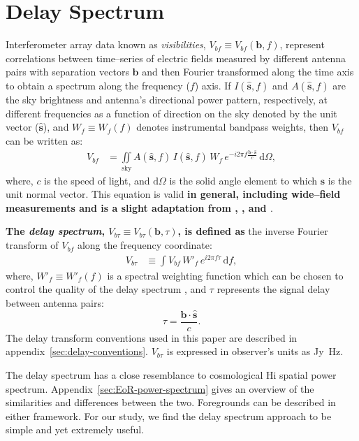 \documentclass[preprint2,iop,numberedappendix,twocolappendix,appendixfloats]{emulateapj}
\newcommand{\dif}{\mathrm{d}}
\begin{document}
\section{Delay Spectrum}\label{sec:delay-spectrum}

Interferometer array data known as {\it visibilities}, $V_{bf}\equiv V_{bf}(\boldsymbol{b},f)$, represent correlations between time--series of electric fields measured by different antenna pairs with separation vectors $\boldsymbol{b}$ and then Fourier transformed along the time axis to obtain a spectrum along the frequency ($f$) axis. If $I(\hat{\boldsymbol{s}},f)$ and $A(\hat{\boldsymbol{s}},f)$ are the sky brightness and antenna's directional power pattern, respectively, at different frequencies as a function of direction on the sky denoted by the unit vector ($\hat{\boldsymbol{s}}$), and $W_f\equiv W_f(f)$ denotes instrumental bandpass weights, then $V_{bf}$ can be written as:
\begin{align}\label{eqn:obsvis}
  V_{bf} &= \iint\limits_\textrm{sky} A(\hat{\boldsymbol{s}},f)\,I(\hat{\boldsymbol{s}},f)\,W_f\,e^{-i2\pi f\frac{\boldsymbol{b}\cdot\hat{\boldsymbol{s}}}{c}}\,\dif\Omega,
\end{align}
where, $c$ is the speed of light, and $\dif\Omega$ is the solid angle element to which $\hat{\boldsymbol{s}}$ is the unit normal vector. This equation is valid {\bf in general, including wide--field measurements and is a slight adaptation from \citet{van34}, \citet{zer38}, and \citet{tho01}}.

{\bf The {\it delay spectrum}, $V_{b\tau}\equiv V_{b\tau}(\boldsymbol{b},\tau)$, is defined as} the inverse Fourier transform of $V_{bf}$ along the frequency coordinate:
\begin{align}\label{eqn:delay-transform}
  V_{b\tau} &\equiv \int V_{bf}\,W'_f\,e^{i2\pi f\tau}\,\dif f,
\end{align}
where, $W'_f\equiv W'_f(f)$ is a spectral weighting function which can be chosen to control the quality of the delay spectrum \citep{thy13,ved12}, and $\tau$ represents the signal delay between antenna pairs:
\begin{equation}\label{eqn:delay}
  \tau = \frac{\boldsymbol{b}\cdot\hat{\boldsymbol{s}}}{c}.
\end{equation}
The delay transform conventions used in this paper are described in appendix~\ref{sec:delay-conventions}. $V_{b\tau}$ is expressed in observer's units as Jy~Hz. 

The delay spectrum has a close resemblance to cosmological H{\sc i} spatial power spectrum. Appendix~\ref{sec:EoR-power-spectrum} gives an overview of the similarities and differences between the two. Foregrounds can be described in either framework. For our study, we find the delay spectrum approach to be simple and yet extremely useful. 
\end{document}
